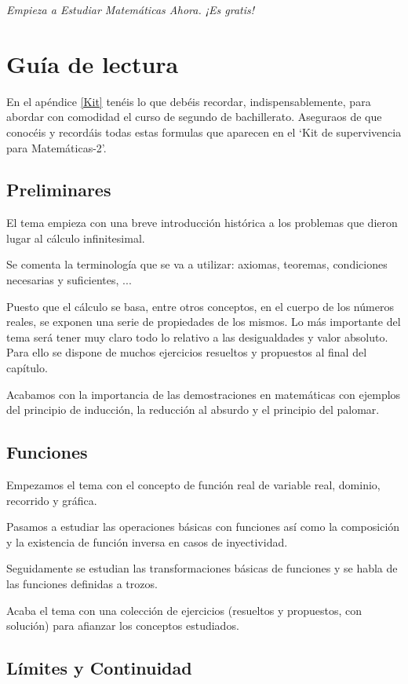 \emph{Empieza a Estudiar Matemáticas Ahora. ¡Es gratis!}

\section{Guía de lectura}	

En el apéndice \ref{Kit} tenéis lo que debéis recordar, indispensablemente, para abordar con comodidad el curso de segundo de bachillerato. Aseguraos de que conocéis y recordáis todas estas formulas que aparecen en el `Kit de supervivencia para Matemáticas-2'.

\subsection{Preliminares}

El tema empieza con una breve introducción histórica a los problemas que dieron lugar al cálculo infinitesimal.

Se comenta la terminología que se va a utilizar: axiomas, teoremas, condiciones necesarias y suficientes, ...

Puesto que el cálculo se basa, entre otros conceptos, en el cuerpo de los números reales, se exponen una serie de propiedades de los mismos. Lo más importante del tema será tener muy claro todo lo relativo a las desigualdades y valor absoluto. Para ello se dispone de muchos ejercicios resueltos y propuestos al final del capítulo.

Acabamos con la importancia de las demostraciones en matemáticas con ejemplos del principio de inducción, la reducción al absurdo y el principio del palomar.

\subsection{Funciones}

Empezamos el tema con el concepto de función real de variable real, dominio, recorrido y gráfica.

Pasamos a estudiar las operaciones básicas con funciones así como la composición y la existencia de función inversa en casos de inyectividad.

Seguidamente se estudian las transformaciones básicas de funciones y se habla de las funciones definidas a trozos.

Acaba el tema con una colección de ejercicios (resueltos y propuestos, con solución) para afianzar los conceptos estudiados.

\subsection{Límites y Continuidad}

